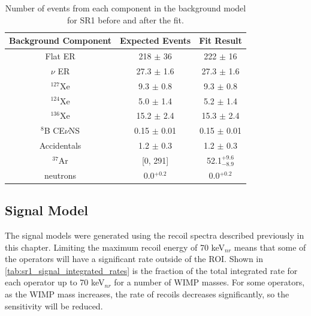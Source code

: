 \begin{table}[]
    \centering
    \begin{tabular}{c|c|c}
        Background Component     & Expected Events & Fit Result             \\ \hline
        Flat ER                  & 218 $\pm$ 36    & 222 $\pm$ 16           \\
        $\nu$ ER                 & 27.3 $\pm$ 1.6  & 27.3 $\pm$ 1.6         \\
        ${}^{127}$Xe             & 9.3 $\pm$ 0.8   & 9.3 $\pm$ 0.8          \\
        ${}^{124}$Xe             & 5.0 $\pm$ 1.4   & 5.2 $\pm$ 1.4          \\
        ${}^{136}$Xe             & 15.2 $\pm$ 2.4  & 15.3 $\pm$ 2.4         \\
        ${}^{8}$B CE$\nu$NS      & 0.15 $\pm$ 0.01 & 0.15 $\pm$ 0.01        \\
        Accidentals              & 1.2 $\pm$ 0.3   & 1.2 $\pm$ 0.3          \\
        ${}^{37}$Ar              & [0, 291]        & 52.1${}^{+9.6}_{-8.9}$ \\
        neutrons                 & 0.0${}^{+0.2}$  & 0.0${}^{+0.2}$
    \end{tabular}
    \caption{Number of events from each component in the background model for SR1 before and after the fit.}
    \label{tab:sr1_ws_lz_backgrounds}
\end{table}


\subsection{Signal Model}
\par
The signal models were generated using the recoil spectra described previously in this chapter.
Limiting the maximum recoil energy of 70 keV$_{nr}$ means that some of the operators will have a significant rate outside of the ROI.
Shown in \autoref{tab:sr1_signal_integrated_rates} is the fraction of the total integrated rate for each operator up to 70 keV$_{nr}$ for a number of WIMP masses.
For some operators, as the WIMP mass increases, the rate of recoils decreases significantly, so the sensitivity will be reduced. 


